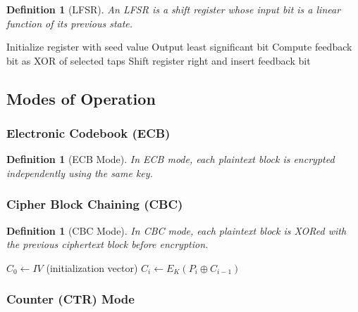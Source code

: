 \documentclass[11pt,a4paper]{article}
\newtheorem{definition}[theorem]{Definition}
\begin{document}
\begin{definition}[LFSR]
An LFSR is a shift register whose input bit is a linear function of its previous state.
\end{definition}

\begin{algorithm}
\caption{LFSR Generation}
\begin{algorithmic}[1]
\STATE Initialize register with seed value
    \STATE Output least significant bit
    \STATE Compute feedback bit as XOR of selected taps
    \STATE Shift register right and insert feedback bit
\ENDFOR
\end{algorithmic}
\end{algorithm}

\subsection{Modes of Operation}

\subsubsection{Electronic Codebook (ECB)}

\begin{definition}[ECB Mode]
In ECB mode, each plaintext block is encrypted independently using the same key.
\end{definition}

\subsubsection{Cipher Block Chaining (CBC)}

\begin{definition}[CBC Mode]
In CBC mode, each plaintext block is XORed with the previous ciphertext block before encryption.
\end{definition}

\begin{algorithm}
\caption{CBC Encryption}
\begin{algorithmic}[1]
\STATE $C_0 \leftarrow IV$ (initialization vector)
    \STATE $C_i \leftarrow E_K(P_i \oplus C_{i-1})$
\ENDFOR
\end{algorithmic}
\end{algorithm}

\subsubsection{Counter (CTR) Mode}
\end{document}
